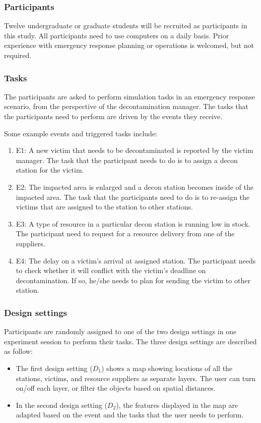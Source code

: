 \subsubsection{Participants} %
\label{sub:participants}
Twelve undergraduate or graduate students will be recruited as participants in this study. All participants need to use computers on a daily basis. Prior experience with emergency response planning or operations is welcomed, but not required.

\subsubsection{Tasks} %
\label{sub:tasks}
The participants are asked to perform simulation tasks in an emergency response scenario, from the perspective of the decontamination manager. The tasks that the participants need to perform are driven by the events they receive.

Some example events and triggered tasks include:

\begin{enumerate}
	\item E1: A new victim that needs to be decontaminated is reported by the victim manager. The task that the participant needs to do is to assign a decon station for the victim.
	\item E2: The impacted area is enlarged and a decon station becomes inside of the impacted area. The task that the participants need to do is to re-assign the victims that are assigned to the station to other stations.
	\item E3: A type of resource in a particular decon station is running low in stock. The participant need to request for a resource delivery from one of the suppliers.
	\item E4: The delay on a victim's arrival at assigned station. The participant needs to check whether it will conflict with the victim's deadline on decontamination. If so, he/she needs to plan for sending the victim to other station.
\end{enumerate}


\subsubsection{Design settings} %
\label{sub:design_settings}
Participants are randomly assigned to one of the two design settings in one experiment session to perform their tasks. The three design settings are described as follow: 
\begin{itemize}
    \item The first design setting ($D_1$) shows a map showing locations of all the stations, victims, and resource suppliers as separate layers. The user can turn on/off each layer, or filter the objects based on spatial distances.
    
    \item In the second design setting ($D_2$), the features displayed in the map are adapted based on the event and the tasks that the user needs to perform. 
\end{itemize}

